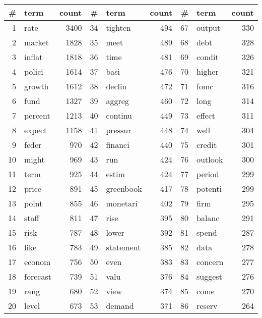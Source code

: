 \begin{tabular}{rlrrlrrlr}
\toprule
  \# &      term &  count &   \# &       term &  count &   \# &     term &  count \\
\midrule
  1 &      rate &   3400 &  34 &    tighten &    494 &  67 &   output &    330 \\
  2 &    market &   1828 &  35 &       meet &    489 &  68 &     debt &    328 \\
  3 &    inflat &   1818 &  36 &       time &    481 &  69 &   condit &    326 \\
  4 &    polici &   1614 &  37 &       basi &    476 &  70 &   higher &    321 \\
  5 &    growth &   1612 &  38 &     declin &    472 &  71 &     fomc &    316 \\
  6 &      fund &   1327 &  39 &     aggreg &    460 &  72 &     long &    314 \\
  7 &   percent &   1213 &  40 &    continu &    449 &  73 &   effect &    311 \\
  8 &    expect &   1158 &  41 &    pressur &    448 &  74 &     well &    304 \\
  9 &     feder &    970 &  42 &    financi &    440 &  75 &   credit &    301 \\
 10 &     might &    969 &  43 &        run &    424 &  76 &  outlook &    300 \\
 11 &      term &    925 &  44 &      estim &    424 &  77 &   period &    299 \\
 12 &     price &    891 &  45 &  greenbook &    417 &  78 &  potenti &    299 \\
 13 &     point &    855 &  46 &   monetari &    402 &  79 &     firm &    295 \\
 14 &     staff &    811 &  47 &       rise &    395 &  80 &   balanc &    291 \\
 15 &      risk &    787 &  48 &      lower &    392 &  81 &    spend &    287 \\
 16 &      like &    783 &  49 &  statement &    385 &  82 &     data &    278 \\
 17 &    econom &    756 &  50 &       even &    383 &  83 &  concern &    277 \\
 18 &  forecast &    739 &  51 &       valu &    376 &  84 &  suggest &    276 \\
 19 &      rang &    680 &  52 &       view &    374 &  85 &     come &    270 \\
 20 &     level &    673 &  53 &     demand &    371 &  86 &   reserv &    264 \\

\end{tabular}
